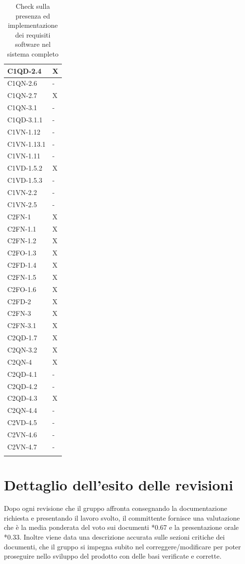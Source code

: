 \begin{footnotesize}
\begin{longtable}{|p{}|p{}|}
 C1QD-2.4&X  \\ \hline
 C1QN-2.6&-  \\ \hline
 C1QN-2.7&X    \\ \hline
 C1QN-3.1&-   \\ \hline
 C1QD-3.1.1&-    \\ \hline
 C1VN-1.12&- \\ \hline
 C1VN-1.13.1&-  \\ \hline
 C1VN-1.11&-  \\ \hline
 C1VD-1.5.2&X \\ \hline
 C1VD-1.5.3&-   \\ \hline
 C1VN-2.2&- \\ \hline
 C1VN-2.5&-  \\ \hline
 C2FN-1&X    \\ \hline
 C2FN-1.1&X    \\ \hline
 C2FN-1.2&X   \\ \hline
 C2FO-1.3&X    \\ \hline
 C2FD-1.4&X   \\ \hline
 C2FN-1.5&X   \\ \hline
 C2FO-1.6&X   \\ \hline
 C2FD-2&X    \\ \hline
 C2FN-3&X   \\ \hline
 C2FN-3.1&X   \\ \hline
 C2QD-1.7&X   \\ \hline
 C2QN-3.2&X   \\ \hline
 C2QN-4 &X  \\ \hline
 C2QD-4.1&-    \\ \hline
 C2QD-4.2&-   \\ \hline
 C2QD-4.3&X   \\ \hline
 C2QN-4.4&-  \\ \hline
 C2VD-4.5&-   \\ \hline
 C2VN-4.6&-    \\ \hline
 C2VN-4.7&-  \\ \hline

\caption{Check sulla presenza ed implementazione dei requisiti software nel
sistema completo}
\end{longtable}
\end{footnotesize}

\section{Dettaglio dell'esito delle revisioni}
Dopo ogni revisione che il gruppo affronta consegnando la documentazione
richiesta e presentando il lavoro svolto, il committente fornisce una
valutazione che \`e la media ponderata del voto sui documenti *0.67 e la
presentazione orale *0.33. Inoltre viene data una descrizione accurata
sulle sezioni critiche dei documenti, che il gruppo si impegna subito
nel correggere/modificare per poter proseguire nello sviluppo del prodotto con delle
basi verificate e corrette.

